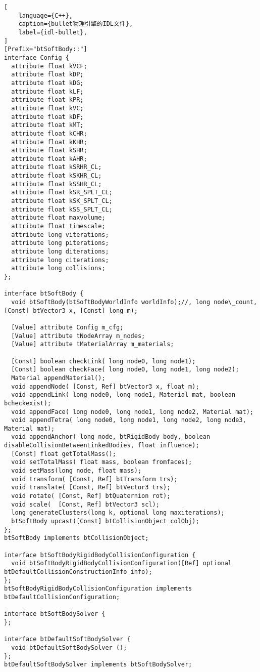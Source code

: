 \begin{lstlisting}[
    language={C++},
    caption={bullet物理引擎的IDL文件},
    label={idl-bullet},
]
[Prefix="btSoftBody::"]
interface Config {
  attribute float kVCF;
  attribute float kDP;
  attribute float kDG;
  attribute float kLF;
  attribute float kPR;
  attribute float kVC;
  attribute float kDF;
  attribute float kMT;
  attribute float kCHR;
  attribute float kKHR;
  attribute float kSHR;
  attribute float kAHR;
  attribute float kSRHR_CL;
  attribute float kSKHR_CL;
  attribute float kSSHR_CL;
  attribute float kSR_SPLT_CL;
  attribute float kSK_SPLT_CL;
  attribute float kSS_SPLT_CL;
  attribute float maxvolume;
  attribute float timescale;
  attribute long viterations;
  attribute long piterations;
  attribute long diterations;
  attribute long citerations;
  attribute long collisions;
};

interface btSoftBody {
  void btSoftBody(btSoftBodyWorldInfo worldInfo);//, long node\_count, [Const] btVector3 x, [Const] long m);

  [Value] attribute Config m_cfg;
  [Value] attribute tNodeArray m_nodes;
  [Value] attribute tMaterialArray m_materials;

  [Const] boolean checkLink( long node0, long node1);
  [Const] boolean checkFace( long node0, long node1, long node2);
  Material appendMaterial();
  void appendNode( [Const, Ref] btVector3 x, float m);
  void appendLink( long node0, long node1, Material mat, boolean bcheckexist);
  void appendFace( long node0, long node1, long node2, Material mat);
  void appendTetra( long node0, long node1, long node2, long node3, Material mat);
  void appendAnchor( long node, btRigidBody body, boolean disableCollisionBetweenLinkedBodies, float influence);
  [Const] float getTotalMass();
  void setTotalMass( float mass, boolean fromfaces);
  void setMass(long node, float mass);
  void transform( [Const, Ref] btTransform trs);
  void translate( [Const, Ref] btVector3 trs);
  void rotate( [Const, Ref] btQuaternion rot);
  void scale(  [Const, Ref] btVector3 scl);
  long generateClusters(long k, optional long maxiterations);
  btSoftBody upcast([Const] btCollisionObject colObj);
};
btSoftBody implements btCollisionObject;

interface btSoftBodyRigidBodyCollisionConfiguration {
  void btSoftBodyRigidBodyCollisionConfiguration([Ref] optional btDefaultCollisionConstructionInfo info);
};
btSoftBodyRigidBodyCollisionConfiguration implements btDefaultCollisionConfiguration;

interface btSoftBodySolver {
};

interface btDefaultSoftBodySolver {
  void btDefaultSoftBodySolver ();
};
btDefaultSoftBodySolver implements btSoftBodySolver;


\end{lstlisting}
